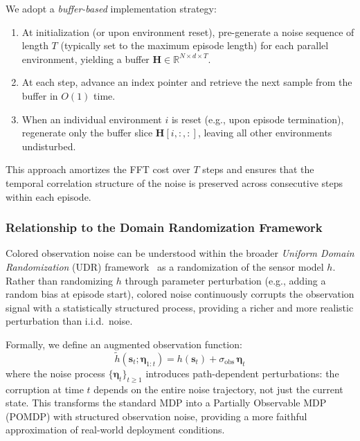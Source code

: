 We adopt a \emph{buffer-based} implementation strategy:
\begin{enumerate}
  \item At initialization (or upon environment reset), pre-generate a noise sequence of length $T$ (typically set to the maximum episode length) for each parallel environment, yielding a buffer $\boldsymbol{H} \in \mathbb{R}^{N \times d \times T}$.
  \item At each step, advance an index pointer and retrieve the next sample from the buffer in $O(1)$ time.
  \item When an individual environment $i$ is reset (e.g., upon episode termination), regenerate only the buffer slice $\boldsymbol{H}[i, :, :]$, leaving all other environments undisturbed.
\end{enumerate}

This approach amortizes the FFT cost over $T$ steps and ensures that the temporal correlation structure of the noise is preserved across consecutive steps within each episode.

\subsubsection{Relationship to the Domain Randomization Framework}

Colored observation noise can be understood within the broader \emph{Uniform Domain Randomization} (UDR) framework~\cite{tobin2017domain} as a randomization of the sensor model $h$.
Rather than randomizing $h$ through parameter perturbation (e.g., adding a random bias at episode start), colored noise continuously corrupts the observation signal with a statistically structured process, providing a richer and more realistic perturbation than i.i.d.\ noise.

Formally, we define an augmented observation function:
\begin{equation}
  \tilde{h}(\boldsymbol{s}_t; \boldsymbol{\eta}_{1:t}) = h(\boldsymbol{s}_t) + \sigma_{\mathrm{obs}} \, \boldsymbol{\eta}_t
  \label{eq:augmented_obs}
\end{equation}
where the noise process $\{\boldsymbol{\eta}_t\}_{t \geq 1}$ introduces path-dependent perturbations: the corruption at time $t$ depends on the entire noise trajectory, not just the current state.
This transforms the standard MDP into a Partially Observable MDP (POMDP) with structured observation noise, providing a more faithful approximation of real-world deployment conditions.

